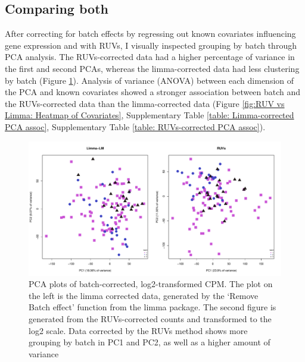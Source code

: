 \documentclass[12pt,a4paper,titlepage,twoside,openright]{book}
\begin{document}
\begin{mainmatter}
{\section{Comparing both}
After correcting for batch effects by regressing out known covariates influencing gene expression and with RUVs, I visually inspected grouping by batch through PCA analysis. The RUVs-corrected data had a higher percentage of variance in the first and second PCAs, whereas the limma-corrected data had less clustering by batch (﻿Figure \ref{fig:RUV vs Limma: PCA by Batch}). Analysis of variance (ANOVA) between each dimension of the PCA and known covariates showed a stronger association between batch and the RUVs-corrected data than the limma-corrected data (﻿Figure \ref{fig:RUV vs Limma: Heatmap of Covariates}﻿, Supplementary Table \ref{table: Limma-corrected PCA assoc}, Supplementary Table \ref{table: RUVs-corrected PCA assoc}). 

\begin{figure}[htb!]
\centering
\includegraphics[width=\textwidth,height=\textheight,keepaspectratio]{Figures/PCA_RUVvsLM_FirstDimension.pdf}
\caption{PCA plots of batch-corrected, log2-transformed CPM. The plot on the left is the limma corrected data, generated by the ‘Remove Batch effect’ function from the limma package. The second figure is generated from the RUVs-corrected counts and transformed to the log2 scale. Data corrected by the RUVs method shows more grouping by batch in PC1 and PC2, as well as a higher amount of variance}
\label{fig:RUV vs Limma: PCA by Batch}
\end{figure}


}
\end{mainmatter}
\end{document}
